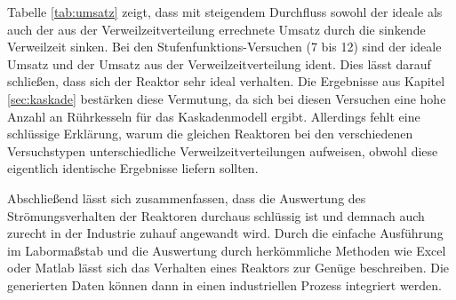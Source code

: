 \documentclass[12pt,liststotoc]{report}
\begin{document}
\par Tabelle \ref{tab:umsatz} zeigt, dass mit steigendem Durchfluss sowohl der ideale als auch der aus der Verweilzeitverteilung errechnete Umsatz durch die sinkende Verweilzeit sinken. Bei den Stufenfunktions-Versuchen (7 bis 12) sind der ideale Umsatz und der Umsatz aus der Verweilzeitverteilung ident. Dies lässt darauf schließen, dass sich der Reaktor sehr ideal verhalten. Die Ergebnisse aus Kapitel \ref{sec:kaskade} bestärken diese Vermutung, da sich bei diesen Versuchen eine hohe Anzahl an Rührkesseln für das Kaskadenmodell ergibt. Allerdings fehlt eine schlüssige Erklärung, warum die gleichen Reaktoren bei den verschiedenen Versuchstypen unterschiedliche Verweilzeitverteilungen aufweisen, obwohl diese eigentlich identische Ergebnisse liefern sollten.


Abschließend lässt sich zusammenfassen, dass die Auswertung des Strömungsverhalten der Reaktoren durchaus schlüssig ist und demnach auch zurecht in der Industrie zuhauf angewandt wird. Durch die einfache Ausführung im Labormaßstab und die Auswertung durch herkömmliche Methoden wie Excel oder Matlab lässt sich das Verhalten eines Reaktors zur Genüge beschreiben. Die generierten Daten können dann in einen industriellen Prozess integriert werden.  

\newpage
{}

\newpage
\setcounter{page}{2}

\newpage
\listoffigures

\newpage
\listoftables


\newpage

% 
%


\printbibliography


\end{document}
